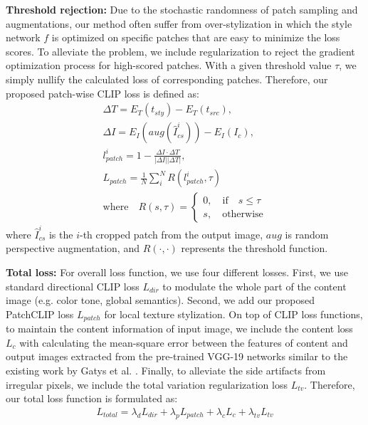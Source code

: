 \documentclass[10pt,twocolumn,letterpaper]{article}
\begin{document}
\noindent \textbf{Threshold rejection:} Due to the stochastic randomness of patch sampling and augmentations, our method often suffer from over-stylization in which the style network $f$ is optimized on specific patches that are easy to minimize the loss scores. To alleviate the problem, we include regularization to reject the gradient optimization process for high-scored patches. With a given threshold value $\tau$, we simply nullify the calculated loss of corresponding patches. Therefore, our proposed patch-wise CLIP loss is defined as:
\begin{align}
\Delta T = E_{T}(t_{sty}) - E_{T}(t_{src}),\nonumber\\ 
\Delta I = E_{I}(aug(\hat{I}^i_{cs})) - E_{I}(I_c),\nonumber\\
l^i_{patch} =1-\frac{\Delta I\cdot \Delta T}{|\Delta I||\Delta T|},\nonumber \\
L_{patch} = \frac{1}{N} \sum^N_i R(l^i_{patch},\tau) \\
\text{where} \quad R(s,\tau)= 
\begin{cases} 
0, \quad\text{if} \quad s\leq \tau \nonumber\\
s , \quad \text{otherwise}
\end{cases}
\end{align}
where $\hat{I}^i_{cs}$ is the $i$-th cropped patch from the output image, $aug$ is random perspective augmentation, and $R(\cdot,\cdot)$ represents the threshold function.

\noindent \textbf{Total loss:} For overall loss function, we use four different losses. First, we use standard directional CLIP loss $L_{dir}$ to modulate the whole part of the content image (e.g. color tone, global semantics). Second, we add our proposed PatchCLIP loss $L_{patch}$ for local texture stylization. On top of CLIP loss functions, to maintain the content information of input image, we include the content loss $L_c$ with calculating the mean-square error between the features of content and output images extracted from the pre-trained VGG-19 networks similar to the existing work by Gatys et al. \cite{gatys}. Finally, to alleviate the side artifacts from irregular pixels, we include the  total variation regularization loss $L_{tv}$. Therefore, our total loss function is formulated as:
\begin{align}
    L_{total} = \lambda_d L_{dir}+ \lambda_p L_{patch} + \lambda_c L_c + \lambda_{tv} L_{tv}
\end{align}
\end{document}
